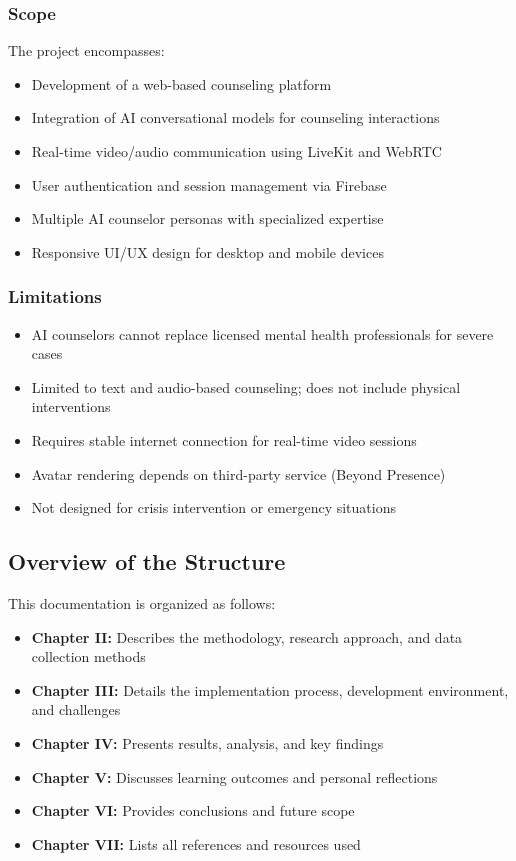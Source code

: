 \documentclass[11pt,a4paper]{article}
\begin{document}
\subsubsection{Scope}
The project encompasses:
\begin{itemize}
    \item Development of a web-based counseling platform
    \item Integration of AI conversational models for counseling interactions
    \item Real-time video/audio communication using LiveKit and WebRTC
    \item User authentication and session management via Firebase
    \item Multiple AI counselor personas with specialized expertise
    \item Responsive UI/UX design for desktop and mobile devices
\end{itemize}

\subsubsection{Limitations}
\begin{itemize}
    \item AI counselors cannot replace licensed mental health professionals for severe cases
    \item Limited to text and audio-based counseling; does not include physical interventions
    \item Requires stable internet connection for real-time video sessions
    \item Avatar rendering depends on third-party service (Beyond Presence)
    \item Not designed for crisis intervention or emergency situations
\end{itemize}

\subsection{Overview of the Structure}
This documentation is organized as follows:

\begin{itemize}
    \item \textbf{Chapter II:} Describes the methodology, research approach, and data collection methods
    \item \textbf{Chapter III:} Details the implementation process, development environment, and challenges
    \item \textbf{Chapter IV:} Presents results, analysis, and key findings
    \item \textbf{Chapter V:} Discusses learning outcomes and personal reflections
    \item \textbf{Chapter VI:} Provides conclusions and future scope
    \item \textbf{Chapter VII:} Lists all references and resources used
\end{itemize}
\end{document}
